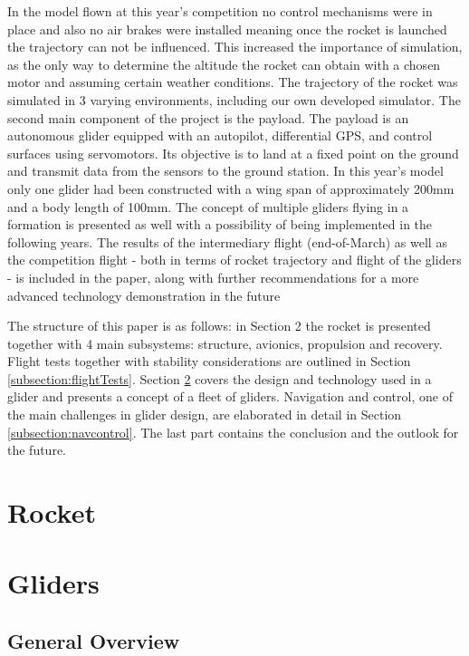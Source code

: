 \documentclass[]{iac}
\begin{document}
In the model flown at this year's competition no control mechanisms were in place and also no air brakes were installed meaning once the rocket is launched the trajectory can not be influenced. This increased the importance of simulation, as the only way to determine the altitude the rocket can obtain with a chosen motor and assuming certain weather conditions.  The trajectory of the rocket was simulated in 3 varying environments, including our own developed simulator. 
The second main component of the project is the payload. The payload is an autonomous glider equipped with an autopilot, differential GPS, and control surfaces using servomotors. Its objective is to land at a fixed point on the ground and transmit data from the sensors to the ground station. In this year's model only one glider had been constructed with a wing span of approximately 200mm and a body length of 100mm. The concept of multiple gliders flying in a formation is presented as well with a possibility of being implemented in the following years.  
The results of the intermediary flight (end-of-March) as well as the competition flight - both in terms of rocket trajectory and flight of the gliders - is included in the paper, along with further recommendations for a more advanced technology demonstration in the future

The structure of this paper is as follows: in Section 2 the rocket is presented together with 4 main subsystems: structure, avionics, propulsion and recovery. Flight tests together with stability considerations are outlined in Section \ref{subsection:flightTests}.  Section \ref{section:gliders}  covers the design and technology used in a glider and presents a concept of a fleet of gliders. Navigation and control, one of the main challenges in glider design, are elaborated in detail in Section \ref{subsection:navcontrol}. The last part contains the conclusion and the outlook for the future. 


\section{Rocket}







\section{Gliders}
\label{section:gliders}


\subsection{General Overview}
\end{document}
